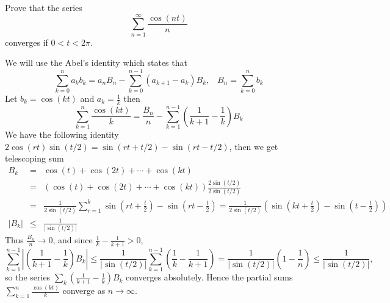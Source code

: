 \begin{problem}
Prove that the series
$$ \sum_{n=1}^\infty \frac{\cos(nt)}{n} $$
converges if $0 < t < 2\pi$.
\begin{solution}
We will use the Abel's identity which states that 
\[\sum_{k=0}^n a_k b_k = a_nB_n - \sum_{k=0}^{n-1}(a_{k+1}-a_k)B_k,\;\;\; B_n = \sum_{k=0}^n b_k\]
Let $b_k = \cos(kt)$ and $a_k = \frac{1}{k}$ then 
\[\sum_{k=1}^n \frac{\cos(kt)}{k}= \frac{B_n}{n}-\sum_{k=1}^{n-1}\left(\frac{1}{k+1}-\frac{1}{k}\right)B_k\]
We have the following identity $2\cos(rt)\sin(t/2) = \sin(rt+t/2)-\sin(rt-t/2)$, then we get telescoping sum 
\[\begin{array}{ccl}
B_k &=&\displaystyle \cos(t)+\cos(2t) +\cdots + \cos(kt) \\ 
&=&\displaystyle \left(\cos(t)+\cos(2t) +\cdots + \cos(kt)\right)\frac{2 \sin(t/2)}{2\sin(t/2)} \\ 
&=& \displaystyle \frac{1}{2\sin(t/2)} \sum_{r=1}^k \sin\left(rt+\frac{t}{2}\right) - \sin\left(rt-\frac{t}{2}\right) =  \frac{1}{2\sin(t/2)} \left(\sin\left(kt+\frac{t}{2}\right) - \sin\left(t-\frac{t}{2}\right) \right) \\ 
|B_k| &\leq&\displaystyle \frac{1}{|\sin(t/2)|}
\end{array}\]
Thus $\frac{B_n}{n}\rightarrow 0$, and since $\frac1k-\frac1{k+1}>0$,
\[\sum_{k=1}^{n-1}\left|\left(\frac{1}{k+1}-\frac{1}{k}\right)B_k\right| \leq \frac{1}{|\sin(t/2)|}\sum_{k=1}^{n-1}\left(\frac1k-\frac{1}{k+1}\right) = \frac{1}{|\sin(t/2)|}\left(1 - \frac{1}{n}\right)\leq \frac{1}{|\sin(t/2)|},\]
so the series $\sum_{k}\left(\frac{1}{k+1}-\frac{1}{k}\right)B_k$ converges absolutely. Hence the partial sums $\sum_{k=1}^n \frac{\cos(kt)}{k}$ converge as $n\rightarrow\infty$.
\end{solution}
\end{problem}
